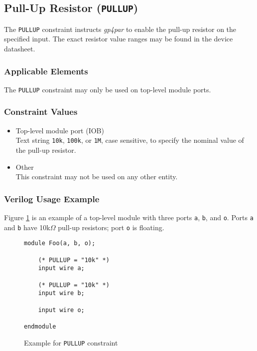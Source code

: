 \documentclass[11pt]{article}
\newcommand{\namestyle}[1]{\textit{#1}}
\newcommand{\tokenstyle}[1]{\texttt{#1}}
\newcommand{\wirestyle}[1]{\texttt{#1}}
\newcommand{\valuestyle}[1]{\texttt{#1}}
\newcommand{\strvaluestyle}[1]{\valuestyle{\textquotedbl#1\textquotedbl}}
\newcommand{\whenstyle}[1]{{\fontseries{sb}\selectfont#1}}
\begin{document}
\pagebreak
\subsection{Pull-Up Resistor (\tokenstyle{PULLUP})}

The \tokenstyle{PULLUP} constraint instructs \namestyle{gp4par} to enable the pull-up resistor on the specified input. The exact resistor
value ranges may be found in the device datasheet.

\subsubsection{Applicable Elements}
The \tokenstyle{PULLUP} constraint may only be used on top-level module ports.

\subsubsection{Constraint Values}
\begin{itemize}
\item \whenstyle{Top-level module port (IOB)}\\
Text string \strvaluestyle{10k}, \strvaluestyle{100k}, or \strvaluestyle{1M}, case sensitive, to specify the nominal value of the pull-up resistor.
\item \whenstyle{Other} \\
This constraint may not be used on any other entity.
\end{itemize}

\subsubsection{Verilog Usage Example}

Figure \ref{constraint-pullup} is an example of a top-level module with three ports \wirestyle{a}, \wirestyle{b}, and
\wirestyle{o}. Ports \wirestyle{a} and \wirestyle{b} have 10k$\Omega$ pull-up resistors; port \wirestyle{o} is floating.

\begin{figure}[h]
\begin{lstlisting}
module Foo(a, b, o);

	(* PULLUP = "10k" *)
	input wire a;

	(* PULLUP = "10k" *)
	input wire b;

	input wire o;

endmodule
\end{lstlisting}
\caption{Example for \tokenstyle{PULLUP} constraint}
\label{constraint-pullup}
\end{figure}
\end{document}
